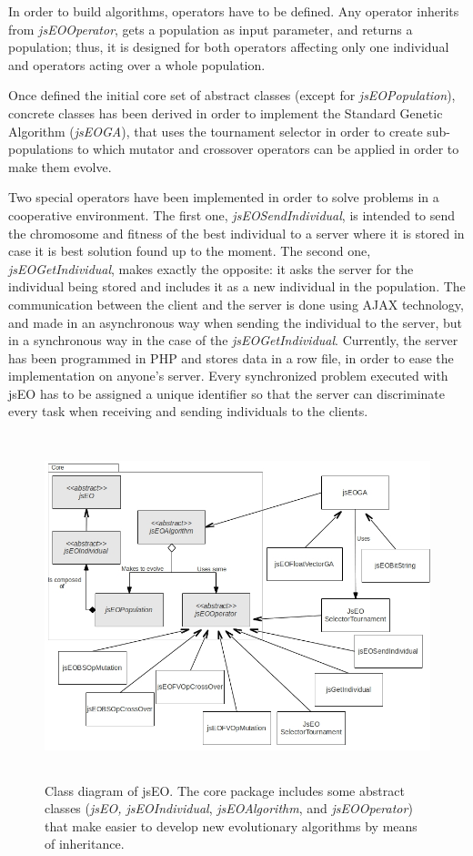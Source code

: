 \documentclass[runningheads,a4paper]{llncs}
\begin{document}
In order to build algorithms, operators have to be defined. Any operator inherits from \textit{jsEOOperator}, gets a population as input parameter, and returns a population; thus, it is designed for both operators affecting only one individual and operators acting over a whole population.

Once defined the initial core set of abstract classes (except for \textit{jsEOPopulation}), concrete classes has been derived in order to implement the Standard Genetic Algorithm (\textit{jsEOGA}), that uses the tournament selector in order to create sub-populations to which mutator and crossover operators can be applied in order to make them evolve.

Two special operators have been implemented in order to solve problems in a cooperative environment. The first one, \textit{jsEOSendIndividual}, is intended to send the chromosome and fitness of the best individual to a server where it is stored in case it is best solution found up to the moment. The second one, \textit{jsEOGetIndividual}, makes exactly the opposite: it asks the server for the individual being stored and includes it as a new individual in the population. The communication between the client and the server is done using AJAX technology, and made in an asynchronous way when sending the individual to the server, but in a synchronous way in the case of the \textit{jsEOGetIndividual}. Currently, the server has been programmed in PHP and stores data in a row file, in order to ease the implementation on anyone's server. Every synchronized problem executed with jsEO has to be assigned a unique identifier so that the server can discriminate every task when receiving and sending individuals to the clients.

\begin{figure}
\centering
\includegraphics[height=10cm]{class-diagram}
\caption{Class diagram of jsEO. The core package includes some abstract classes (\textit{jsEO, jsEOIndividual}, \textit{jsEOAlgorithm}, and \textit{jsEOOperator}) that make easier to develop new evolutionary algorithms by means of inheritance.}
\label{fig:jsEO-class-diagram}
\end{figure}
\end{document}
